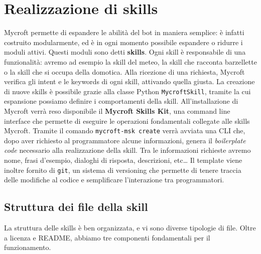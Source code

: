 \chapter{Realizzazione di skills}
\label{chap:skills}
Mycroft permette di espandere le abilità del bot in maniera semplice: è infatti costruito modularmente, ed è in ogni momento possibile espandere o ridurre i moduli attivi.
Questi moduli sono detti \textbf{skills}. Ogni skill è responsabile di una funzionalità: avremo ad esempio la skill del meteo, la skill che racconta barzellette o la skill che si occupa della domotica. Alla ricezione di una richiesta, Mycroft verifica gli intent e le keywords di ogni skill, attivando quella giusta.
La creazione di nuove skills è possibile grazie alla classe Python \texttt{MycroftSkill}, tramite la cui espansione possiamo definire i comportamenti della skill. All'installazione di Mycroft verrà reso disponibile il \textbf{Mycroft Skills Kit}, una command line interface che permette di eseguire le operazioni fondamentali collegate alle skills Mycroft. Tramite il comando \texttt{mycroft-msk create} verrà avviata una CLI che, dopo aver richiesto al programmatore alcune informazioni, genera il \textit{boilerplate code} necessario alla realizzazione della skill. Tra le informazioni richieste avremo nome, frasi d'esempio, dialoghi di risposta, descrizioni, etc\dots
Il template viene inoltre fornito di \texttt{git}, un sistema di versioning che permette di tenere traccia delle modifiche al codice e semplificare l'interazione tra programmatori.
\section{Struttura dei file della skill}
La struttura delle skills è ben organizzata, e vi sono diverse tipologie di file. Oltre a licenza e README, abbiamo tre componenti fondamentali per il funzionamento.
